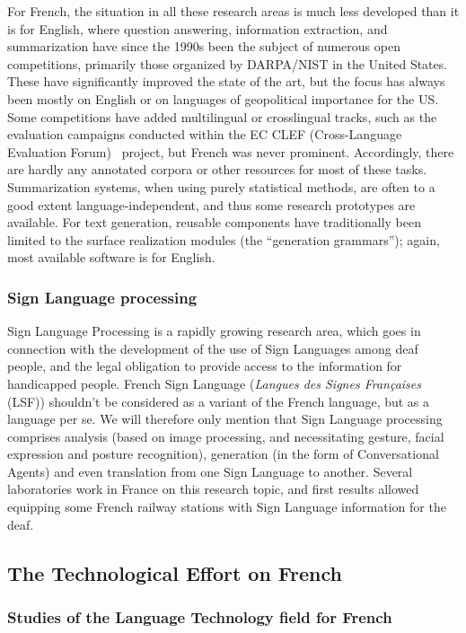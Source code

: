 \begin{multicols}{2}
For French, the situation in all these research areas is much less
developed than it is for English, where question answering,
information extraction, and summarization have since the 1990s been
the subject of numerous open competitions, primarily those organized
by DARPA/NIST in the United States. These have significantly improved
the state of the art, but the focus has always been mostly on English
or on languages of geopolitical importance for the US. Some
competitions have added multilingual or crosslingual tracks, such as
the evaluation campaigns conducted within the EC CLEF (Cross-Language
Evaluation Forum)~\cite{clef} project, but French was never
prominent. Accordingly, there are hardly any annotated corpora or
other resources for most of these tasks. Summarization systems, when
using purely statistical methods, are often to a good extent
language-independent, and thus some research prototypes are
available. For text generation, reusable components have traditionally
been limited to the surface realization modules (the ``generation
grammars''); again, most available software is for English.

\subsubsection{Sign Language processing}

Sign Language Processing is a rapidly growing research area, which
goes in connection with the development of the use of Sign Languages
among deaf people, and the legal obligation to provide access to the
information for handicapped people. French Sign Language ({\em Langues des
Signes Françaises} (LSF)) shouldn't be considered as a variant of the
French language, but as a language per se. We will therefore only
mention that Sign Language processing comprises analysis (based on
image processing, and necessitating gesture, facial expression and
posture recognition), generation (in the form of Conversational
Agents) and even translation from one Sign Language to
another. Several laboratories work in France on this research topic,
and first results allowed equipping some French railway stations with
Sign Language information for the deaf.

\subsection{The Technological Effort on French}

\subsubsection{Studies of the Language Technology field for French}


\end{multicols}

